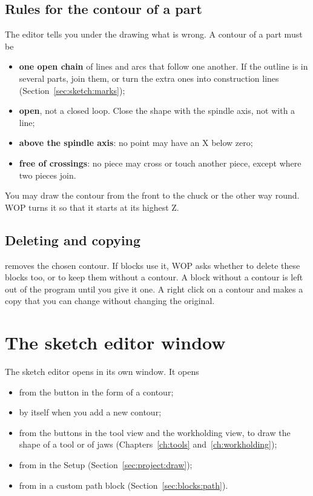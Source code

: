 \subsection{Rules for the contour of a part}
The editor tells you under the drawing what is wrong. A contour of a part must be

\begin{itemize}
\item \textbf{one open chain} of lines and arcs that follow one another. If the outline is in several parts, join them, or turn the extra ones into construction lines (Section~\ref{sec:sketch:marks});
\item \textbf{open}, not a closed loop. Close the shape with the spindle axis, not with a line;
\item \textbf{above the spindle axis}: no point may have an X below zero;
\item \textbf{free of crossings}: no piece may cross or touch another piece, except where two pieces join.
\end{itemize}

You may draw the contour from the front to the chuck or the other way round. WOP turns it so that it starts at its highest Z.

\subsection{Deleting and copying}
 removes the chosen contour. If blocks use it, WOP asks whether to delete these blocks too, or to keep them without a contour. A block without a contour is left out of the program until you give it one. A right click on a contour and  makes a copy that you can change without changing the original.

\section{The sketch editor window}\label{sec:sketch:window}

The sketch editor opens in its own window. It opens

\begin{itemize}
\item from the button  in the form of a contour;
\item by itself when you add a new contour;
\item from the buttons in the tool view and the workholding view, to draw the shape of a tool or of jaws (Chapters~\ref{ch:tools} and~\ref{ch:workholding});
\item from  in the Setup (Section~\ref{sec:project:draw});
\item from  in a custom path block (Section~\ref{sec:blocks:path}).
\end{itemize}

